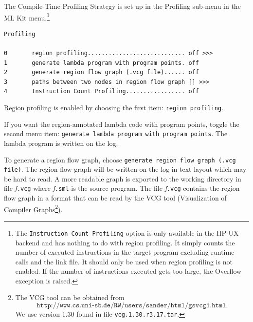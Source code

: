 \documentclass[12pt]{book}
\begin{document}
The Compile-Time Profiling Strategy is set up in the Profiling
sub-menu
%
in the ML Kit menu.\footnote{The \texttt{Instruction Count
    Profiling}
  option is only available in the HP-UX backend and has nothing to do
  with region profiling. It simply counts the number of executed
  instructions in the target program excluding runtime calls and the
  link file. It should only be used when region profiling is not
  enabled. If the number of instructions executed gets too large, the
  Overflow exception is raised.}

\begin{verbatim}
Profiling

0       region profiling............................ off >>>
1       generate lambda program with program points. off
2       generate region flow graph (.vcg file)...... off
3       paths between two nodes in region flow graph [] >>>
4       Instruction Count Profiling................. off
\end{verbatim}
\noindent
Region profiling is enabled by choosing the first item:
%
\mbox{\texttt{region profiling}}.

If you want the region-annotated lambda code with program points,
toggle the second menu item:
%
\texttt{generate lambda program with program points}.  The lambda
program is written on the log.

To generate a region flow graph, choose 
%
\texttt{generate region flow graph (.vcg file)}. The region flow graph
will be written on the log in text layout which may be hard to read.
A more readable graph is exported to the working directory in file
\emph{f}\texttt{.vcg} where \emph{f}\texttt{.sml} is the source
program.  The file \emph{f}\texttt{.vcg} contains the region flow
graph in a format that can be read by the
%
VCG tool (Visualization of Compiler Graphs\footnote{The VCG tool can
  be obtained from
  \[\texttt{http://www.cs.uni-sb.de/RW/users/sander/html/gsvcg1.html}.\]
  We use version 1.30 found in file \texttt{vcg.1.30.r3.17.tar}.}).
\end{document}
